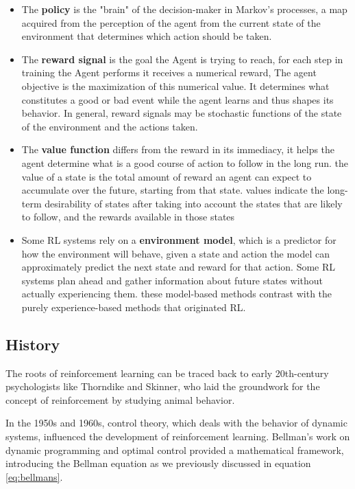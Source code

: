 \begin{itemize}
    \item The \textbf{policy} is the "brain" of the decision-maker in Markov's processes, a map acquired from the perception of the agent from the current state of the environment that determines which action should be taken.
    
    \item The \textbf{reward signal} is the goal the Agent is trying to reach, for each step in training the Agent performs it receives a numerical reward, The agent objective is the maximization of this numerical value. It determines what constitutes a good or bad event while the agent learns and thus shapes its behavior. In general, reward signals may be stochastic functions of the state of the environment and the actions taken.
    
    \item The \textbf{value function} differs from the reward in its immediacy, it helps the agent determine what is a good course of action to follow in the long run. the value of a state is the total amount of reward an agent can expect to accumulate over the future, starting from that state. values indicate the long-term desirability of states after taking into account the states that are likely to follow, and the rewards available in those states
     
    \item Some RL systems rely on a \textbf{environment model}, which is a predictor for how the environment will behave, given a state and action the model can approximately predict the next state and reward for that action. Some RL systems plan ahead and gather information about future states without actually experiencing them. these model-based methods contrast with the purely experience-based methods that originated RL.
\end{itemize}

\subsection*{History}
The roots of reinforcement learning can be traced back to early 20th-century psychologists like Thorndike\cite{} and Skinner\cite{}, who laid the groundwork for the concept of reinforcement by studying animal behavior.

In the 1950s and 1960s, control theory, which deals with the behavior of dynamic systems, influenced the development of reinforcement learning. Bellman's work on dynamic programming and optimal control provided a mathematical framework, introducing the Bellman equation as we previously discussed in equation \ref{eq:bellmans}.

